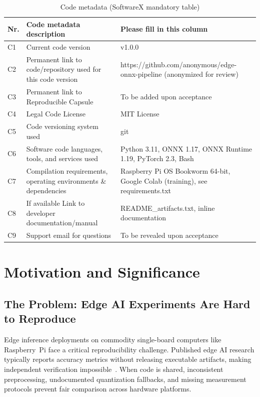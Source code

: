 \documentclass[review]{elsarticle}
\begin{document}
\begin{table}[!h]
\begin{tabular}{|l|p{6.5cm}|p{6.5cm}|}
\hline
\textbf{Nr.} & \textbf{Code metadata description} & \textbf{Please fill in this column} \\
\hline
C1 & Current code version & v1.0.0 \\
\hline
C2 & Permanent link to code/repository used for this code version & https://github.com/anonymous/edge-onnx-pipeline (anonymized for review) \\
\hline
C3 & Permanent link to Reproducible Capsule & To be added upon acceptance \\
\hline
C4 & Legal Code License & MIT License \\
\hline
C5 & Code versioning system used & git \\
\hline
C6 & Software code languages, tools, and services used & Python 3.11, ONNX 1.17, ONNX Runtime 1.19, PyTorch 2.3, Bash \\
\hline
C7 & Compilation requirements, operating environments \& dependencies & Raspberry Pi OS Bookworm 64-bit, Google Colab (training), see requirements.txt \\
\hline
C8 & If available Link to developer documentation/manual & README\_artifacts.txt, inline documentation \\
\hline
C9 & Support email for questions & To be revealed upon acceptance \\
\hline
\end{tabular}
\caption{Code metadata (SoftwareX mandatory table)}
\label{tab:code-metadata}
\end{table}

\section{Motivation and Significance}
\label{sec:motivation}

\subsection{The Problem: Edge AI Experiments Are Hard to Reproduce}

Edge inference deployments on commodity single-board computers like Raspberry~Pi face a critical reproducibility challenge. Published edge AI research typically reports accuracy metrics without releasing executable artifacts, making independent verification impossible~\cite{thermals_arxiv,mlperf_edge}. When code is shared, inconsistent preprocessing, undocumented quantization fallbacks, and missing measurement protocols prevent fair comparison across hardware platforms.
\end{document}
